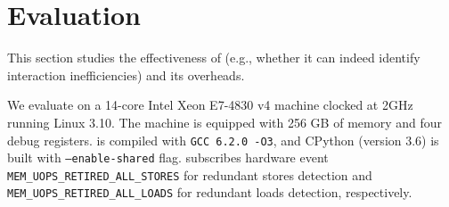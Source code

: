 \section{Evaluation}
\label{evaluation}
This section studies the effectiveness of \tool{} (e.g., whether it can indeed identify interaction inefficiencies) and its overheads. 

We evaluate \tool{} on a 14-core Intel Xeon E7-4830 v4 machine clocked at 2GHz running Linux 3.10. The machine is equipped with 256 GB of memory and four debug registers. \tool is compiled with {\tt  GCC 6.2.0 -O3}, and CPython (version 3.6) is built with {\tt --enable-shared} flag. \tool subscribes hardware event {\tt MEM\_UOPS\_RETIRED\_ALL\_STORES} for redundant stores detection and {\tt MEM\_UOPS\_RETIRED\_ALL\_LOADS} for redundant loads detection, respectively.




























